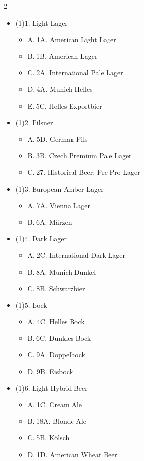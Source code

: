 \begin{multicols*}{2}
\begin{itemize}[noitemsep]
\item[] (1)1. Light Lager
\begin{itemize}
  \item[] A. 1A. American Light Lager
  \item[] B. 1B. American Lager
  \item[] C. 2A. International Pale Lager
  \item[] D. 4A. Munich Helles
  \item[] E. 5C. Helles Exportbier
\end{itemize}
\item[] (1)2. Pilsner
\begin{itemize}
  \item[] A. 5D. German Pils
  \item[] B. 3B. Czech Premium Pale Lager
  \item[] C. 27. Historical Beer: Pre-Pro Lager
\end{itemize}
\item[] (1)3. European Amber Lager
\begin{itemize}
  \item[] A. 7A. Vienna Lager
  \item[] B. 6A. Märzen
\end{itemize}
\item[] (1)4. Dark Lager
\begin{itemize}
  \item[] A. 2C. International Dark Lager
  \item[] B. 8A. Munich Dunkel
  \item[] C. 8B. Schwarzbier
\end{itemize}
\item[] (1)5. Bock
\begin{itemize}
  \item[] A. 4C. Helles Bock
  \item[] B. 6C. Dunkles Bock
  \item[] C. 9A. Doppelbock
  \item[] D. 9B. Eisbock
\end{itemize}
\item[] (1)6. Light Hybrid Beer
\begin{itemize}
  \item[] A. 1C. Cream Ale
  \item[] B. 18A. Blonde Ale
  \item[] C. 5B. Kölsch
  \item[] D. 1D. American Wheat Beer
\end{itemize}

\end{itemize}
\end{multicols*}
